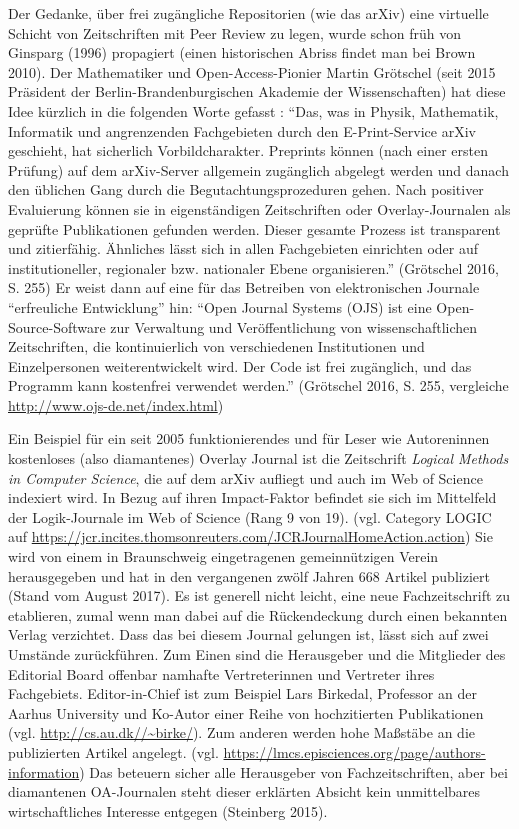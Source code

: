 \documentclass[a4paper,
fontsize=11pt,
oneside,
numbers=noperiodatend,
parskip=half-,
bibliography=totoc,
final
]{scrartcl}
\begin{document}
Der Gedanke, über frei zugängliche Repositorien (wie das arXiv) eine
virtuelle Schicht von Zeitschriften mit Peer Review zu legen, wurde
schon früh von Ginsparg (1996) propagiert (einen historischen Abriss
findet man bei Brown 2010). Der Mathematiker und Open-Access-Pionier
Martin Grötschel (seit 2015 Präsident der Berlin-Brandenburgischen
Akademie der Wissenschaften) hat diese Idee kürzlich in die folgenden
Worte gefasst : \enquote{Das, was in Physik, Mathematik, Informatik und
angrenzenden Fachgebieten durch den E-Print-Service arXiv geschieht, hat
sicherlich Vorbildcharakter. Preprints können (nach einer ersten
Prüfung) auf dem arXiv-Server allgemein zugänglich abgelegt werden und
danach den üblichen Gang durch die Begutachtungsprozeduren gehen. Nach
positiver Evaluierung können sie in eigenständigen Zeitschriften oder
Overlay-Journalen als geprüfte Publikationen gefunden werden. Dieser
gesamte Prozess ist transparent und zitierfähig. Ähnliches lässt sich in
allen Fachgebieten einrichten oder auf institutioneller, regionaler bzw.
nationaler Ebene organisieren.} (Grötschel 2016, S. 255) Er weist dann
auf eine für das Betreiben von elektronischen Journale
\enquote{erfreuliche Entwicklung} hin: \enquote{Open Journal Systems
(OJS) ist eine Open-Source-Software zur Verwaltung und Veröffentlichung
von wissenschaftlichen Zeitschriften, die kontinuierlich von
verschiedenen Institutionen und Einzelpersonen weiterentwickelt wird.
Der Code ist frei zugänglich, und das Programm kann kostenfrei verwendet
werden.} (Grötschel 2016, S. 255, vergleiche
\url{http://www.ojs-de.net/index.html})

Ein Beispiel für ein seit 2005 funktionierendes und für Leser wie
Autoreninnen kostenloses (also diamantenes) Overlay Journal ist die
Zeitschrift \emph{Logical Methods in Computer Science}, die auf dem
arXiv aufliegt und auch im Web of Science indexiert wird. In Bezug auf
ihren Impact-Faktor befindet sie sich im Mittelfeld der Logik-Journale
im Web of Science (Rang 9 von 19). (vgl. Category LOGIC auf
\url{https://jcr.incites.thomsonreuters.com/JCRJournalHomeAction.action})
Sie wird von einem in Braunschweig eingetragenen gemeinnützigen Verein
herausgegeben und hat in den vergangenen zwölf Jahren 668 Artikel
publiziert (Stand vom August 2017). Es ist generell nicht leicht, eine
neue Fachzeitschrift zu etablieren, zumal wenn man dabei auf die
Rückendeckung durch einen bekannten Verlag verzichtet. Dass das bei
diesem Journal gelungen ist, lässt sich auf zwei Umstände zurückführen.
Zum Einen sind die Herausgeber und die Mitglieder des Editorial Board
offenbar namhafte Vertreterinnen und Vertreter ihres Fachgebiets.
Editor-in-Chief ist zum Beispiel Lars Birkedal, Professor an der Aarhus
University und Ko-Autor einer Reihe von hochzitierten Publikationen
(vgl. \url{http://cs.au.dk//~birke/}). Zum anderen werden hohe Maßstäbe
an die publizierten Artikel angelegt. (vgl.
\url{https://lmcs.episciences.org/page/authors-information}) Das
beteuern sicher alle Herausgeber von Fachzeitschriften, aber bei
diamantenen OA-Journalen steht dieser erklärten Absicht kein
unmittelbares wirtschaftliches Interesse entgegen (Steinberg 2015).
\end{document}
